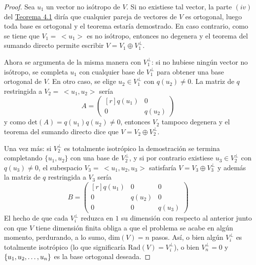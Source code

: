 \documentclass[12pt]{report}
\theoremstyle{definition}
\theoremstyle{definition}
\theoremstyle{remark}
\begin{document}
\begin{proof}
Sea $u_1$ un vector no isótropo de $V$. Si no existiese tal vector, la parte $(iv)$ del \hyperref[teo4.1.]{\color{blue}Teorema 4.1} diría que cualquier pareja de vectores de $V$ es ortogonal, luego toda base es ortogonal y el teorema estaría demostrado. En caso contrario, como se tiene que $V_1 = \ <u_1>$ es no isótropo, entonces no degenera y el teorema del sumando directo permite escribir $V = V_1 \oplus V_1^\perp$.

\vspace{2mm}
Ahora se argumenta de la misma manera con $V_1^\perp$: si no hubiese ningún vector no isótropo, se completa $u_1$ con cualquier base de $V_1^\perp$ para obtener una base ortogonal de $V$. En otro caso, se elige $u_2 \in V_1^\perp$ con $q(u_2) \neq 0$. La matriz de $q$ restringida a $V_2 = \ <u_1,u_2>$ sería
\[A = \begin{pmatrix*}[r]
    q(u_1) & 0 \\
    0 & q(u_2)
\end{pmatrix*}\]
y como $\textrm{det}(A) = q(u_1)q(u_2) \neq 0$, entonces $V_2$ tampoco degenera y el teorema del sumando directo dice que $V = V_2 \oplus V_2^\perp$.

\vspace{2mm}
Una vez más: si $V_2^\perp$ es totalmente isotrópico la demostración se termina completando $\{u_1,u_2\}$ con una base de $V_2^\perp$, y si por contrario existiese $u_3 \in V_2^\perp$ con $q(u_3) \neq 0$, el subespacio $V_3 = \ <u_1,u_2,u_3>$ satisfaría $V = V_3 \oplus V_3^\perp$ y además la matriz de $q$ restringida a $V_3$ sería
\[B = \begin{pmatrix*}[r]
    q(u_1) & 0 & 0 \\
    0 & q(u_2) & 0 \\
    0 & 0 & q(u_3)
\end{pmatrix*}\]
El hecho de que cada $V_i^\perp$ reduzca en $1$ su dimensión con respecto al anterior junto con que $V$ tiene dimensión finita obliga a que el problema se acabe en algún momento, perdurando, a lo sumo, $\textrm{dim}(V) = n$ pasos. Así, o bien algún $V_i^\perp$ es totalmente isotrópico (lo que significaría $\textrm{Rad}(V) = V_i^\perp$), o bien $V_n^\perp = 0$ y $\{u_1,u_2,\mathellipsis,u_n\}$ es la base ortogonal deseada.
\end{proof}
\end{document}
